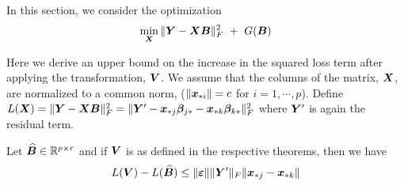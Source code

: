 In this section, we consider the optimization
\begin{equation}\label{eqn:L2}
\min_{\bX} \|\bY - \bX \bB \|_F^2 \ + \ G(\bB)   
\end{equation}

Here we derive an upper bound on the increase in the squared loss term after applying the transformation, $\boldsymbol{V}$. We assume that the columns of the matrix, $\boldsymbol{X}$, are normalized to a common norm, \ie ($\|\boldsymbol{x}_{{\ast} i}\| = c$ for $i = 1,\cdots,p$). Define $L(\boldsymbol{X}) = \|\boldsymbol{Y} - \boldsymbol{X} \boldsymbol{B} \|_F^2 = \|\boldsymbol{Y}' - \boldsymbol{x}_{{\ast} j} \boldsymbol{\beta}_{j {\ast}} - \boldsymbol{x}_{{\ast} k} \boldsymbol{\beta}_{k {\ast}}\|_F^2$ where $\boldsymbol{Y}'$ is again the residual term. 

\begin{lemma}
Let $\widehat{\boldsymbol{B}} \in {\mathbb R}^{p \times r}$ and if $\boldsymbol{V}$ is as defined in the respective theorems, then we have 
$$L(\boldsymbol{V}) - L(\widehat{\boldsymbol{B}}) \leq \|\boldsymbol{\varepsilon}\|  \|\boldsymbol{Y}'\|_F \| \boldsymbol{x}_{{\ast} j} - \boldsymbol{x}_{{\ast} k} \|$$
\end{lemma}
